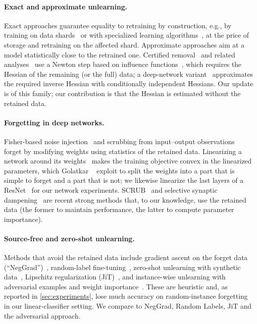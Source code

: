 \documentclass[10pt,twocolumn,letterpaper]{article}
\begin{document}
\paragraph{Exact and approximate unlearning.}
Exact approaches guarantee equality to retraining by construction, e.g., by training on data shards~\cite{bourtoule2021machine} or with specialized learning algorithms~\cite{cao2015towards,ginart2019making}, at the price of storage and retraining on the affected shard.
Approximate approaches aim at a model statistically close to the retrained one.
Certified removal~\cite{guo2020certified} and related analyses~\cite{sekhari2021remember,izzo2021approximate,neel2021descent} use a Newton step based on influence functions~\cite{koh2017understanding}, which requires the Hessian of the remaining (or the full) data; a deep-network variant~\cite{mehta2022deep} approximates the required inverse Hessian with conditionally independent Hessians.
Our update is of this family; our contribution is that the Hessian is estimated without the retained data.

\paragraph{Forgetting in deep networks.}
Fisher-based noise injection~\cite{golatkar2020eternal} and scrubbing from input--output observations~\cite{golatkar2020forgetting} forget by modifying weights using statistics of the retained data.
Linearizing a network around its weights~\cite{lee2019wide} makes the training objective convex in the linearized parameters, which Golatkar \etal~\cite{golatkar2021mixed} exploit to split the weights into a part that is simple to forget and a part that is not; we likewise linearize the last layers of a ResNet~\cite{he2016deep} for our network experiments.
SCRUB~\cite{kurmanji2023towards} and selective synaptic dampening~\cite{foster2024fast} are recent strong methods that, to our knowledge, use the retained data (the former to maintain performance, the latter to compute parameter importance).

\paragraph{Source-free and zero-shot unlearning.}
Methods that avoid the retained data include gradient ascent on the forget data (``NegGrad'')~\cite{tarun2023fast}, random-label fine-tuning~\cite{graves2021amnesiac,tarun2023fast}, zero-shot unlearning with synthetic data~\cite{chundawat2023zero}, Lipschitz regularization (JiT)~\cite{foster2024information}, and instance-wise unlearning with adversarial examples and weight importance~\cite{cha2024learning}.
These are heuristic and, as reported in \cref{sec:experiments}, lose much accuracy on random-instance forgetting in our linear-classifier setting.
We compare to NegGrad, Random Labels, JiT and the adversarial approach.
\end{document}
